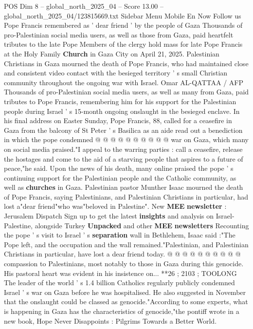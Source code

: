 \begin{textsample}{POS Dim 8 – global\_north\_2025\_04 – Score 13.00 – global\_north\_2025\_04/123815669.txt}  \label{ex:f8_pos_026}
Sidebar Menu Mobile En Now Follow us Pope Francis remembered as ' dear friend ' by the people of Gaza Thousands of pro-Palestinian social media users, as well as those from Gaza, paid heartfelt tributes to the late Pope Members of the clergy hold mass for late Pope Francis at the Holy Family \textbf{Church} in Gaza City on April 21, 2025.
Palestinian Christians in Gaza mourned the death of Pope Francis, who had maintained close and consistent video contact with the besieged territory ' s small Christian community throughout the ongoing war with Israel.
Omar AL-QATTAA / AFP Thousands of pro-Palestinian social media users, as well as many from Gaza, paid tributes to Pope Francis, remembering him for his support for the Palestinian people during Israel ' s 15-month ongoing onslaught in the besieged enclave.
In his final address on Easter Sunday, Pope Francis, 88, called for a ceasefire in Gaza from the balcony of St Peter ' s Basilica as an aide read out a benediction in which the pope condemned @ @ @ @ @ @ @ @ @ @ war on Gaza, which many on social media praised."I appeal to the warring parties : call a ceasefire, release the hostages and come to the aid of a starving people that aspires to a future of peace,"he said.
Upon the news of his death, many online praised the pope ' s continuing support for the Palestinian people and the Catholic community, as well as \textbf{churches} in Gaza.
Palestinian pastor Munther Isaac mourned the death of Pope Francis, saying Palestinians, and Palestinian Christians in particular, had lost a"dear friend"who was"beloved in Palestine".
New \textbf{MEE} \textbf{newsletter} : Jerusalem Dispatch Sign up to get the latest \textbf{insights} and analysis on Israel-Palestine, alongside Turkey \textbf{Unpacked} and other \textbf{MEE} \textbf{newsletters} Recounting the pope ' s visit to Israel ' s \textbf{separation} wall in Bethlehem, Isaac said :"The Pope left, and the occupation and the wall remained."Palestinian, and Palestinian Christians in particular, have lost a dear friend today. @ @ @ @ @ @ @ @ @ @ compassion to Palestinians, most notably to those in Gaza during this genocide.
His pastoral heart was evident in his insistence on... **26 ; 2103 ; TOOLONG The leader of the world ' s 1.4 billion Catholics regularly publicly condemned Israel ' s war on Gaza before he was hospitalised.
He also suggested in November that the onslaught could be classed as genocide."According to some experts, what is happening in Gaza has the characteristics of genocide,"the pontiff wrote in a new book, Hope Never Disappoints : Pilgrims Towards a Better World.

\end{textsample}
